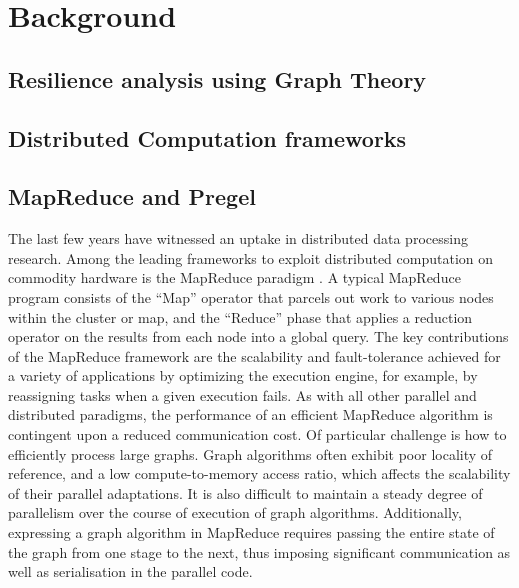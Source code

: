 \section{Background}
\label{background}

\subsection{Resilience analysis using Graph Theory}
\label{resilience}

 
\subsection{Distributed Computation frameworks}
\label{distcomp}

\subsection{MapReduce and Pregel}

The last few years have witnessed an uptake in distributed data processing research. Among the leading frameworks to exploit distributed computation on commodity hardware is the MapReduce paradigm \cite{mapreduce}. A typical MapReduce program consists of the ``Map'' operator that parcels out work to various nodes within the cluster or map, and the ``Reduce'' phase that applies a reduction operator on the results from each node into a global query. The key contributions of the MapReduce framework are the scalability and fault-tolerance achieved for a variety of applications by optimizing the execution engine, for example, by reassigning tasks when a given execution fails. As with all other parallel and distributed paradigms, the performance of an efficient MapReduce algorithm is contingent upon a reduced communication cost. Of particular challenge is how to efficiently process large graphs. Graph algorithms often exhibit poor locality of reference, and a low compute-to-memory access ratio, which affects the scalability of their parallel adaptations. It is also difficult to maintain a steady degree of parallelism over the course of execution of graph algorithms. Additionally, expressing a graph algorithm in MapReduce requires passing the entire state of the graph from one stage to the next, thus imposing significant communication as well as serialisation in the parallel code. 

